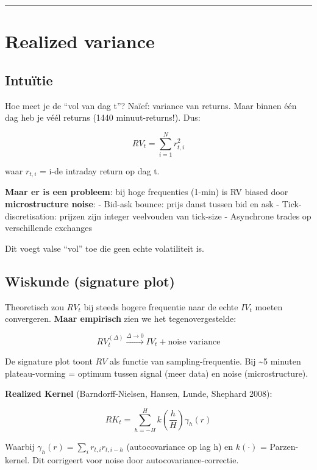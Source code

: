 \begin{center}\rule{0.5\linewidth}{0.5pt}\end{center}

\hypertarget{realized-variance}{%
\section{Realized variance}\label{realized-variance}}

\hypertarget{intuuxeftie-1}{%
\subsection{Intuïtie}\label{intuuxeftie-1}}

Hoe meet je de ``vol van dag t''? Naïef: variance van returns. Maar binnen één dag heb je véél returns (1440 minuut-returns!). Dus:

\[RV_t = \sum_{i=1}^{N} r_{t,i}^2\]

waar \(r_{t,i}\) = i-de intraday return op dag t.

\textbf{Maar er is een probleem}: bij hoge frequenties (1-min) is RV biased door \textbf{microstructure noise}:
- Bid-ask bounce: prijs danst tussen bid en ask
- Tick-discretisation: prijzen zijn integer veelvouden van tick-size
- Asynchrone trades op verschillende exchanges

Dit voegt valse ``vol'' toe die geen echte volatiliteit is.

\hypertarget{wiskunde-signature-plot}{%
\subsection{Wiskunde (signature plot)}\label{wiskunde-signature-plot}}

Theoretisch zou \(RV_t\) bij steeds hogere frequentie naar de echte \(IV_t\) moeten convergeren. \textbf{Maar empirisch} zien we het tegenovergestelde:

\[RV_t^{(\Delta)} \xrightarrow{\Delta \to 0} IV_t + \text{noise variance}\]

De signature plot toont \(RV\) als functie van sampling-frequentie. Bij \textasciitilde5 minuten plateau-vorming = optimum tussen signal (meer data) en noise (microstructure).

\textbf{Realized Kernel} (Barndorff-Nielsen, Hansen, Lunde, Shephard 2008):

\[RK_t = \sum_{h=-H}^{H} k\left(\frac{h}{H}\right) \gamma_h(r)\]

Waarbij \(\gamma_h(r) = \sum_i r_{t,i} r_{t,i-h}\) (autocovariance op lag h) en \(k(\cdot)\) = Parzen-kernel. Dit corrigeert voor noise door autocovariance-correctie.

